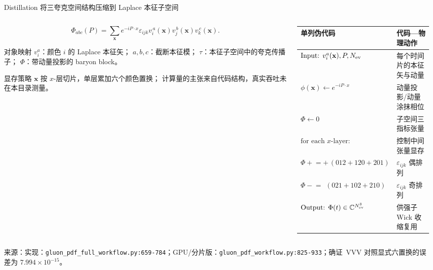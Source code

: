 \documentclass[UTF8,aspectratio=169,11pt]{ctexbeamer}
\newcommand{\source}[1]{%
  \vspace{0.06em}\par{\raggedright\scriptsize\color{muted}来源：#1\par}}
\newcommand{\verified}{\textcolor{evidence}{确证}}
\newcommand{\codepath}[1]{\nolinkurl{#1}}
\begin{document}
\begin{frame}[t]{Distillation 将三夸克空间结构压缩到 Laplace 本征子空间}
  \begin{columns}[T,totalwidth=\textwidth]
    \begin{column}{0.42\textwidth}
      \small
      \begin{equation*}
        \Phi_{abc}(P)=\sum_{\mathbf x}e^{-iP\cdot x}
        \varepsilon_{ijk}v_i^{\,a}(\mathbf x)v_j^{\,b}(\mathbf x)v_k^{\,c}(\mathbf x).
      \end{equation*}
      \begin{block}{对象映射}
        \(v_i^a\)：颜色 \(i\) 的 Laplace 本征矢；
        \(a,b,c\)：截断本征模；
        \(\tau\)：本征子空间中的夸克传播子；
        \(\Phi\)：带动量投影的 baryon block。
      \end{block}
      \begin{block}{显存策略}
        \(\mathbf x\) 按 \(x\)-层切片，单层累加六个颜色置换；
        计算量的主张来自代码结构，真实吞吐未在本目录测量。
      \end{block}
    \end{column}
    \begin{column}{0.54\textwidth}
      \small
      \begin{tabularx}{\linewidth}{@{}lY@{}}
        \toprule
        单列伪代码 & 代码—物理动作 \\
        \midrule
        \(\text{Input: }v^a_i(\mathbf x),P,N_{\rm ev}\) & 每个时间片的本征矢与动量 \\
        \(\phi(\mathbf x)\gets e^{-iP\cdot x}\) & 动量投影/动量涂抹相位 \\
        \(\Phi\gets0\) & 子空间三指标张量 \\
        \(\text{for each }x\text{-layer}:\) & 控制中间张量显存 \\
        \quad \(\Phi\mathrel{+}=+\,(012+120+201)\) & \(\varepsilon_{ijk}\) 偶排列 \\
        \quad \(\Phi\mathrel{-}=\ \,(021+102+210)\) & \(\varepsilon_{ijk}\) 奇排列 \\
        \(\text{Output: }\Phi(t)\in\mathbb C^{N_{\rm ev}^3}\) & 供强子 Wick 收缩复用 \\
        \bottomrule
      \end{tabularx}
    \end{column}
  \end{columns}
  \source{实现：\codepath{gluon_pdf_full_workflow.py:659-784}；GPU/分片版：\codepath{gluon_pdf_workflow.py:825-933}；\verified\ VVV 对照显式六置换的误差为 \(7.994\times10^{-15}\)。}
\end{frame}
\end{document}
